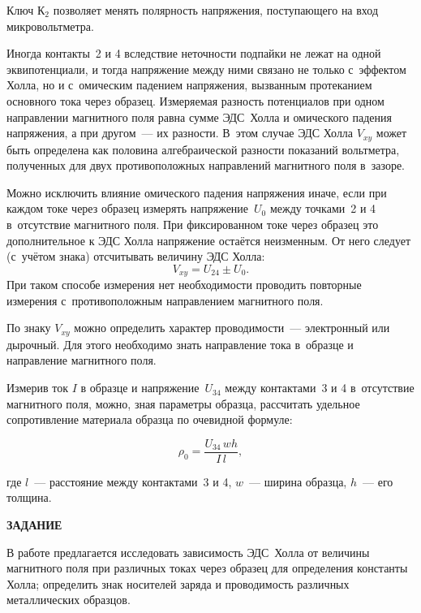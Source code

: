 Ключ К$_2$ позволяет менять полярность напряжения, поступающего на вход микровольтметра.

Иногда контакты~2 и 4 вследствие неточности подпайки не лежат на одной эквипотенциали, и тогда напряжение между ними связано не только с~эффектом Холла, но и с~омическим падением напряжения, вызванным протеканием основного тока через образец. Измеряемая разность потенциалов при одном направлении магнитного поля равна сумме ЭДС~Холла и омического падения напряжения, а при другом~--- их разности. В~этом случае ЭДС Холла $V_{xy}$ может быть определена как половина
алгебраической разности показаний вольтметра, полученных для двух противоположных направлений магнитного поля в~зазоре.


Можно исключить влияние омического падения напряжения иначе, если при каждом токе через образец измерять
напряжение~$U_0$ между точками~2 и 4 в~отсутствие магнитного поля. При фиксированном токе через образец это
дополнительное к ЭДС Холла напряжение остаётся неизменным. От него следует (с~учётом знака) отсчитывать величину
ЭДС Холла:
\begin{equation}
V_{xy}=U_{24}\pm U_0.
\label{eq3.5.1}
\end{equation}
При таком способе измерения нет необходимости проводить повторные измерения с~противоположным направлением магнитного поля.

По знаку $V_{xy}$ можно определить характер проводимости~--- электронный или дырочный. Для этого необходимо знать
направление тока в~образце и направление магнитного поля.

Измерив ток $I$ в образце и напряжение~$U_{34}$ между контактами~3 и 4 в~отсутствие магнитного поля, можно, зная
параметры образца, рассчитать удельное сопротивление материала образца по очевидной формуле:

\begin{equation}
\rho_0=\frac{U_{34}\, wh}{I\, l},
\label{eq3.5.2}
\end{equation}

где $l$~--- расстояние между контактами~3 и 4, $w$~--- ширина образца, $h$~--- его толщина.

{\Large \bf ЗАДАНИЕ}

В работе предлагается исследовать зависимость ЭДС~Холла от величины магнитного поля при различных токах через образец для определения константы Холла; определить знак носителей заряда и проводимость различных металлических образцов.

